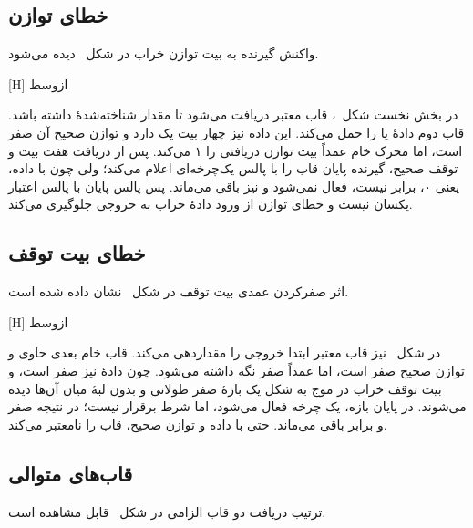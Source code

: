 \subsection{خطای توازن}

واکنش گیرنده به بیت توازن خراب در شکل~ دیده می‌شود.

[H]
‌ازوسط

در بخش نخست شکل~، قاب  معتبر دریافت می‌شود تا
 مقدار شناخته‌شدهٔ  داشته باشد. قاب دوم دادهٔ
 یا  را حمل می‌کند. این داده نیز چهار بیت یک دارد و توازن
صحیح آن صفر است، اما محرک خام عمداً بیت توازن دریافتی را ۱ می‌کند. پس از دریافت هفت بیت
و توقف صحیح، گیرنده پایان قاب را با پالس یک‌چرخه‌ای  اعلام می‌کند؛
ولی چون  با  داده، یعنی ۰، برابر نیست،
 فعال نمی‌شود و  نیز  باقی می‌ماند. پس
پالس پایان با پالس اعتبار یکسان نیست و خطای توازن از ورود دادهٔ خراب به خروجی جلوگیری
می‌کند.


\subsection{خطای بیت توقف}

اثر صفرکردن عمدی بیت توقف در شکل~ نشان داده شده است.

[H]
‌ازوسط

در شکل~ نیز قاب معتبر  ابتدا خروجی را مقداردهی می‌کند. قاب
خام بعدی حاوی  و توازن صحیح صفر است، اما  عمداً صفر نگه داشته
می‌شود. چون  دادهٔ  نیز صفر است،  و بیت توقف خراب در موج به
شکل یک بازهٔ صفر طولانی و بدون لبهٔ میان آن‌ها دیده می‌شوند. در پایان بازه،
 یک چرخه فعال می‌شود، اما شرط  برقرار نیست؛ در
نتیجه  صفر و  برابر  باقی می‌ماند. حتی با
داده و توازن صحیح،  قاب را نامعتبر می‌کند.


\subsection{قاب‌های متوالی}

ترتیب دریافت دو قاب الزامی در شکل~ قابل مشاهده است.

